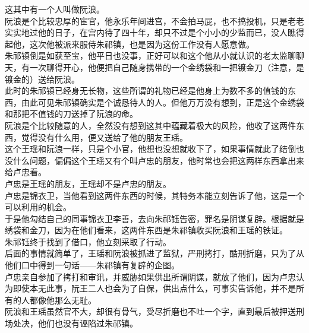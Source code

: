 \begin{multicols}{\theparacolNo}
这其中有一个人叫做阮浪。\\

阮浪是个比较忠厚的宦官，他永乐年间进宫，不会拍马屁，也不搞投机，只是老老实实地过他的日子，在宫内待了四十年，却只不过是个小小的少监而已，没人瞧得起他，这次他被派来服侍朱祁镇，也是因为这份工作没有人愿意做。\\

朱祁镇倒是如获至宝，他平日也没事，正好可以和这个他从小就认识的老太监聊聊天，有一次聊得开心，他便把自己随身携带的一个金绣袋和一把镀金刀（注意，是镀金的）送给阮浪。\\

此时的朱祁镇已经身无长物，这些所谓的礼物已经是他身上为数不多的值钱的东西，由此可见朱祁镇确实是个诚恳待人的人。但他万万没有想到，正是这个金绣袋和那把不值钱的刀送掉了阮浪的命。\\

阮浪是个比较随意的人，全然没有想到这其中蕴藏着极大的风险，他收了这两件东西，觉得没有什么用，便又送给了他的朋友王瑶。\\

这个王瑶和阮浪一样，只是个小官，他想也没想就收下了，如果事情就此了结倒也没什么问题，偏偏这个王瑶又有个叫卢忠的朋友，他时常也会把这两样东西拿出来给卢忠看。\\

卢忠是王瑶的朋友，王瑶却不是卢忠的朋友。\\

卢忠是锦衣卫，当他看到这两件东西的时候，其特务本能立刻告诉了他，这是一个可以利用的机会。\\

于是他勾结自己的同事锦衣卫李善，去向朱祁钰告密，罪名是阴谋复辟。根据就是绣袋和金刀，因为在他们看来，这两件东西是朱祁镇收买阮浪和王瑶的铁证。\\

朱祁钰终于找到了借口，他立刻采取了行动。\\

后面的事情就简单了，王瑶和阮浪被抓进了监狱，严刑拷打，酷刑折磨，只为了从他们口中得到一句话——朱祁镇有复辟的企图。\\

卢忠亲自参加了拷打和审讯，并威胁如果供出所谓阴谋，就放了他们，因为卢忠认为即使本无此事，阮王二人也会为了自保，供出点什么，可事实告诉他，并不是所有的人都像他那么无耻。\\

阮浪和王瑶虽然官不大，却很有骨气，受尽折磨也不吐一个字，直到最后被押送刑场处决，他们也没有诬陷过朱祁镇。\\


\end{multicols}
